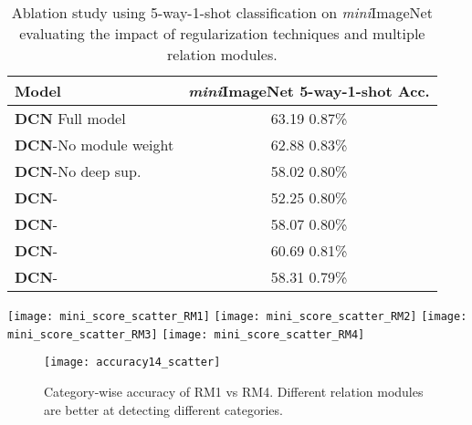 \documentclass[conference]{IEEEtran}
\def\modelnameshort{DCN}
\def\miniIN{\textit{mini}ImageNet}
\def\imagenet{ImageNet}
\newcommand{\cut}[1]{}
\begin{document}
\setlength{\tabcolsep}{4.8pt}
\begin{table}[t]
\centering
\footnotesize
\begin{tabular}{@{} lc @{}}
\toprule
{\bf Model}  & {\bf \miniIN{} 5-way-1-shot Acc.}\\
\midrule 
\textbf{\textsc{\modelnameshort{}}} Full model  & {63.19}  0.87\%  \\ 
\textbf{\textsc{\modelnameshort{}}}-No module weight & {62.88}  0.83\%  \\ 
\textbf{\textsc{\modelnameshort{}}}-No deep sup.   &58.02  0.80\% \\ 
\midrule
\textbf{\textsc{\modelnameshort{}}}- & 52.25  0.80\%  \\ 
\textbf{\textsc{\modelnameshort{}}}-  & 58.07  0.80\%  \\ 
\textbf{\textsc{\modelnameshort{}}}-  & 60.69  0.81\%  \\ 
\textbf{\textsc{\modelnameshort{}}}-  & 58.31  0.79\%  \\
\bottomrule
\end{tabular}\caption{\small \small
Ablation study using 5-way-1-shot classification on \miniIN{} evaluating the impact of regularization techniques and multiple relation modules.
}
\label{tab:ablation1}
\end{table}



\begin{figure*}[t]
    \centering
\texttt{[image: mini\_score\_scatter\_RM1]}
    \texttt{[image: mini\_score\_scatter\_RM2]}
    \texttt{[image: mini\_score\_scatter\_RM3]}
    \texttt{[image: mini\_score\_scatter\_RM4]}
    \vspace{-0.1cm}
    \caption{\small Illustration of query-support score distribution and the link to \imagenet{} hierarchy. Colors indicate query images of a  class triple matching the specified \imagenet{} distance relationship .  \cut{{\color{blue} } , {\color{green} } , {\color{red} } }}
    \label{fig:my_label}
\end{figure*}

\begin{figure}[tb]
    \centering
\texttt{[image: accuracy14\_scatter]}
    \vspace{-0.2cm}
    \caption{\small Category-wise accuracy of RM1 vs RM4. Different relation modules are better at detecting different categories. }
    \label{fig:accScatter}
\end{figure}
\end{document}
